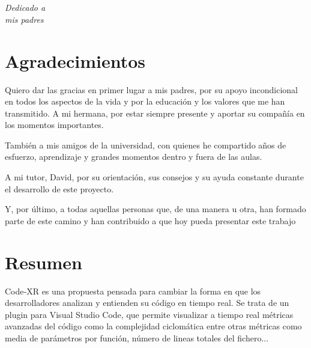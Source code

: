 \documentclass[a4paper, 12pt]{book}
\begin{document}

\chapter*{}
\begin{flushright}
\textit{Dedicado a \\
mis padres}
\end{flushright}


\chapter*{Agradecimientos}
Quiero dar las gracias en primer lugar a mis padres, por su apoyo incondicional en todos los aspectos de la vida y por la educación y los valores que me han transmitido. A mi hermana, por estar siempre presente y aportar su compañía en los momentos importantes.

También a mis amigos de la universidad, con quienes he compartido años de esfuerzo, aprendizaje y grandes momentos dentro y fuera de las aulas.

A mi tutor, David, por su orientación, sus consejos y su ayuda constante durante el desarrollo de este proyecto.

Y, por último, a todas aquellas personas que, de una manera u otra, han formado parte de este camino y han contribuido a que hoy pueda presentar este trabajo

\chapter*{Resumen}

Code‑XR es una propuesta pensada para cambiar la forma en que los desarrolladores analizan y entienden su código en tiempo real. Se trata de un plugin para Visual Studio Code, que permite visualizar a tiempo real métricas avanzadas del código como la complejidad ciclomática entre otras métricas como media de parámetros por función, número de lineas totales del fichero...
\end{document}
